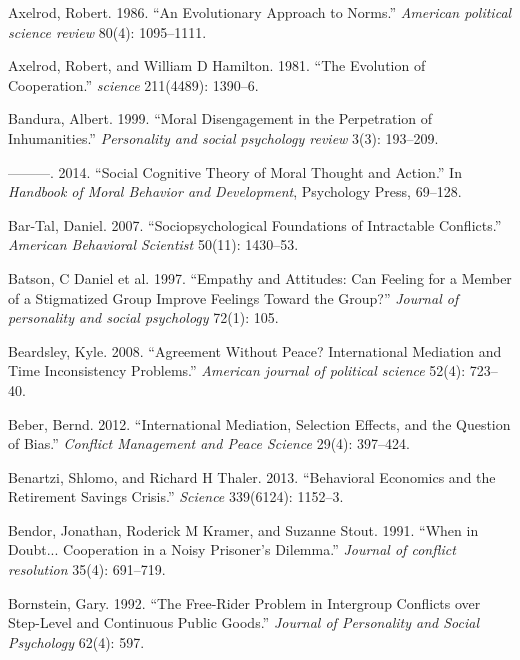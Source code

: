 \documentclass[11pt]{article}
\begin{document}
\leavevmode\hypertarget{ref-axelrod1986evolutionary}{}%
Axelrod, Robert. 1986. ``An Evolutionary Approach to Norms.''
\emph{American political science review} 80(4): 1095--1111.

\leavevmode\hypertarget{ref-axelrod1981evolution}{}%
Axelrod, Robert, and William D Hamilton. 1981. ``The Evolution of
Cooperation.'' \emph{science} 211(4489): 1390--6.

\leavevmode\hypertarget{ref-bandura1999moral}{}%
Bandura, Albert. 1999. ``Moral Disengagement in the Perpetration of
Inhumanities.'' \emph{Personality and social psychology review} 3(3):
193--209.

\leavevmode\hypertarget{ref-bandura2014social}{}%
---------. 2014. ``Social Cognitive Theory of Moral Thought and
Action.'' In \emph{Handbook of Moral Behavior and Development},
Psychology Press, 69--128.

\leavevmode\hypertarget{ref-bar2007sociopsychological}{}%
Bar-Tal, Daniel. 2007. ``Sociopsychological Foundations of Intractable
Conflicts.'' \emph{American Behavioral Scientist} 50(11): 1430--53.

\leavevmode\hypertarget{ref-batson1997empathy}{}%
Batson, C Daniel et al. 1997. ``Empathy and Attitudes: Can Feeling for a
Member of a Stigmatized Group Improve Feelings Toward the Group?''
\emph{Journal of personality and social psychology} 72(1): 105.

\leavevmode\hypertarget{ref-beardsley2008agreement}{}%
Beardsley, Kyle. 2008. ``Agreement Without Peace? International
Mediation and Time Inconsistency Problems.'' \emph{American journal of
political science} 52(4): 723--40.

\leavevmode\hypertarget{ref-beber2012international}{}%
Beber, Bernd. 2012. ``International Mediation, Selection Effects, and
the Question of Bias.'' \emph{Conflict Management and Peace Science}
29(4): 397--424.

\leavevmode\hypertarget{ref-benartzi2013behavioral}{}%
Benartzi, Shlomo, and Richard H Thaler. 2013. ``Behavioral Economics and
the Retirement Savings Crisis.'' \emph{Science} 339(6124): 1152--3.

\leavevmode\hypertarget{ref-bendor1991doubt}{}%
Bendor, Jonathan, Roderick M Kramer, and Suzanne Stout. 1991. ``When in
Doubt... Cooperation in a Noisy Prisoner's Dilemma.'' \emph{Journal of
conflict resolution} 35(4): 691--719.

\leavevmode\hypertarget{ref-bornstein1992free}{}%
Bornstein, Gary. 1992. ``The Free-Rider Problem in Intergroup Conflicts
over Step-Level and Continuous Public Goods.'' \emph{Journal of
Personality and Social Psychology} 62(4): 597.
\end{document}
